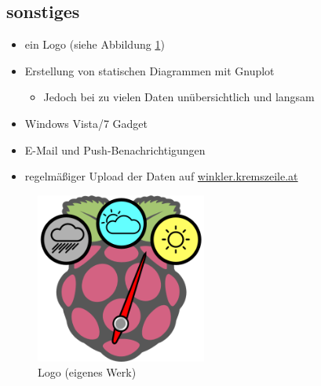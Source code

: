 \subsection{sonstiges}
\label{subsec:sonstiges}

\begin{itemize}
	\item ein Logo (siehe Abbildung \ref{fig:logo})
	\item Erstellung von statischen Diagrammen mit Gnuplot
	\begin{itemize}
		\item Jedoch bei zu vielen Daten unübersichtlich und langsam
	\end{itemize}
	\item Windows Vista/7 Gadget
	\item E-Mail und Push-Benachrichtigungen
	\item regelmäßiger Upload der Daten auf \href{http://winkler.kremszeile.at}{winkler.kremszeile.at}
\end{itemize}

\begin{figure}[h]
  \centering
     \includegraphics[width=0.5\textwidth]{figures/logo.png}
  \caption{Logo (eigenes Werk)}
  \label{fig:logo}
\end{figure}